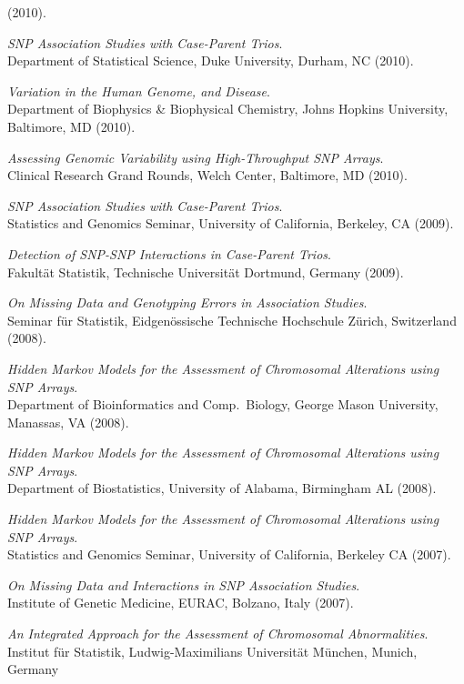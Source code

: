 \documentclass[10pt]{article}
\begin{document}
(2010).
\item
{\it SNP Association Studies with Case-Parent Trios}.\\
Department of Statistical Science, Duke University, Durham, NC
(2010).
\item
{\it Variation in the Human Genome, and Disease}.\\
Department of Biophysics \& Biophysical Chemistry, Johns Hopkins University, Baltimore, MD
(2010).
\item
{\it Assessing Genomic Variability using High-Throughput SNP Arrays}.\\
Clinical Research Grand Rounds, Welch Center, Baltimore, MD
(2010).
\item
{\it SNP Association Studies with Case-Parent Trios}.\\
Statistics and Genomics Seminar, University of California, Berkeley, CA
(2009).
\item
{\it Detection of SNP-SNP Interactions in Case-Parent Trios}.\\
Fakult\"at Statistik, Technische Universit\"at Dortmund, Germany
(2009).
\item
{\it On Missing Data and Genotyping Errors in Association Studies}.\\
Seminar f\"ur Statistik, Eidgen\"ossische Technische Hochschule Z\"urich, Switzerland
(2008).
\item
{\it Hidden Markov Models for the Assessment of Chromosomal Alterations using SNP Arrays}.\\
Department of Bioinformatics and Comp.~Biology, George Mason University, Manassas, VA
(2008).
\item
{\it Hidden Markov Models for the Assessment of Chromosomal Alterations using SNP Arrays}.\\
Department of Biostatistics, University of Alabama, Birmingham AL 
(2008).
\item
{\it Hidden Markov Models for the Assessment of Chromosomal Alterations using SNP Arrays}.\\
Statistics and Genomics Seminar, University of California, Berkeley CA
(2007).
\item
{\it On Missing Data and Interactions in SNP Association Studies}.\\
Institute of Genetic Medicine, EURAC, Bolzano, Italy
(2007).
\item
{\it An Integrated Approach for the Assessment of Chromosomal Abnormalities}.\\
Institut f\"ur Statistik, Ludwig-Maximilians Universit\"at M\"unchen, Munich, Germany
\end{document}
